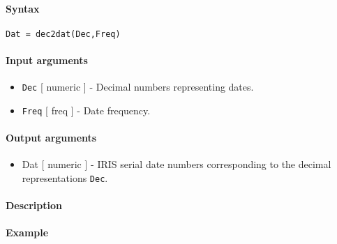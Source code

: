 


	\paragraph{Syntax}\label{syntax}

\begin{verbatim}
Dat = dec2dat(Dec,Freq)
\end{verbatim}

\paragraph{Input arguments}\label{input-arguments}

\begin{itemize}
\item
  \texttt{Dec} {[} numeric {]} - Decimal numbers representing dates.
\item
  \texttt{Freq} {[} freq {]} - Date frequency.
\end{itemize}

\paragraph{Output arguments}\label{output-arguments}

\begin{itemize}
\itemsep1pt\parskip0pt
\item
  Dat {[} numeric {]} - IRIS serial date numbers corresponding to the
  decimal representations \texttt{Dec}.
\end{itemize}

\paragraph{Description}\label{description}

\paragraph{Example}\label{example}


